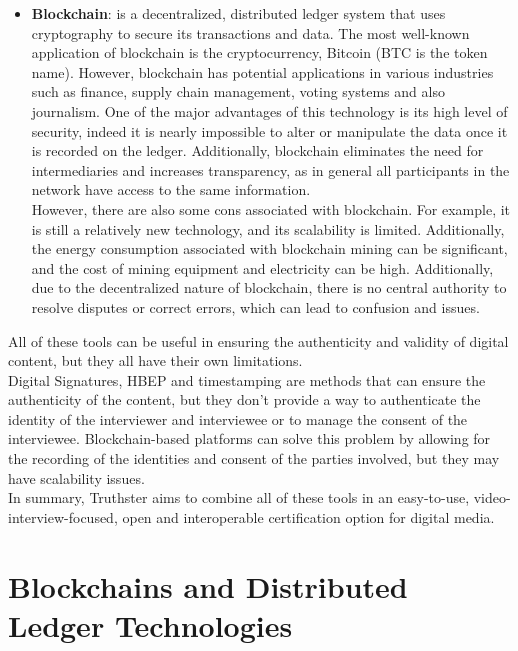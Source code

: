 \documentclass[target=mst,aauheader=]{thud}
\begin{document}
\begin{itemize}
    \item \textbf{Blockchain}: is a decentralized, distributed ledger system that uses cryptography to secure its transactions and data. The most well-known application of blockchain is the cryptocurrency, Bitcoin (BTC is the token name). However, blockchain has potential applications in various industries such as finance, supply chain management, voting systems and also journalism. One of the major advantages of this technology is its high level of security, indeed it is nearly impossible to alter or manipulate the data once it is recorded on the ledger. Additionally, blockchain eliminates the need for intermediaries and increases transparency, as in general all participants in the network have access to the same information.\\However, there are also some cons associated with blockchain. For example, it is still a relatively new technology, and its scalability is limited. Additionally, the energy consumption associated with blockchain mining can be significant, and the cost of mining equipment and electricity can be high. Additionally, due to the decentralized nature of blockchain, there is no central authority to resolve disputes or correct errors, which can lead to confusion and issues.

\end{itemize}

All of these tools can be useful in ensuring the authenticity and validity of digital content, but they all have their own limitations.\\
Digital Signatures, HBEP and timestamping are methods that can ensure the authenticity of the content, but they don't provide a way to authenticate the identity of the interviewer and interviewee or to manage the consent of the interviewee. Blockchain-based platforms can solve this problem by allowing for the recording of the identities and consent of the parties involved, but they may have scalability issues.\\

In summary, Truthster aims to combine all of these tools in an easy-to-use, video-interview-focused, open and interoperable certification option for digital media.


\chapter{Blockchains and Distributed Ledger Technologies}
\label{chapter:blockchain}
\end{document}
